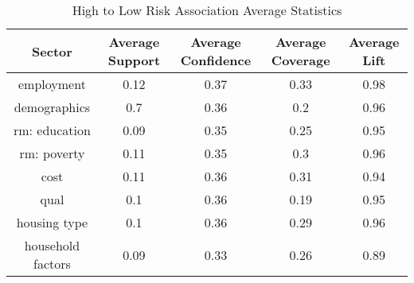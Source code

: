 \begin{table}[h]
    \centering
    \caption{High to Low Risk Association Average Statistics}
    \label{tab:high_low_risk}
    \begin{tabular}{|c|c|c|c|c|}
    \hline
    Sector & Average Support & Average Confidence & Average Coverage & Average Lift \\
    \hline
    employment & 0.12 & 0.37 & 0.33 & 0.98 \\
    demographics & 0.7 & 0.36 & 0.2 & 0.96 \\
    rm: education & 0.09 & 0.35 & 0.25 & 0.95 \\
    rm: poverty & 0.11 & 0.35 & 0.3 & 0.96 \\
    cost & 0.11 & 0.36 & 0.31 & 0.94 \\
    qual & 0.1 & 0.36 & 0.19 & 0.95 \\
    housing type & 0.1 & 0.36 & 0.29 & 0.96 \\
    household factors & 0.09 & 0.33 & 0.26 & 0.89 \\
    \hline
    \end{tabular}
    \end{table}
      